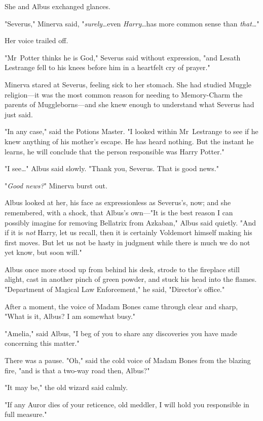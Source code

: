She and Albus exchanged glances.

"Severus," Minerva said, "\emph{surely}…even \emph{Harry}…has
more common sense than \emph{that…}"

Her voice trailed off.

"Mr~Potter thinks he is God," Severus said without expression, "and Lesath
Lestrange fell to his knees before him in a heartfelt cry of prayer."

Minerva stared at Severus, feeling sick to her stomach. She had studied Muggle
religion---it was the most common reason for needing to Memory-Charm the
parents of Muggleborns---and she knew enough to understand what Severus had
just said.

"In any case," said the Potions Master. "I looked within Mr~Lestrange to see
if he knew anything of his mother's escape. He has heard nothing. But the
instant he learns, he will conclude that the person responsible was Harry
Potter."

"I see…" Albus said slowly. "Thank you, Severus. That is good news."

"\emph{Good news?}" Minerva burst out.

Albus looked at her, his face as expressionless as Severus's, now; and she
remembered, with a shock, that Albus's own---"It is the best reason I can
possibly imagine for removing Bellatrix from Azkaban," Albus said quietly. "And
if it is \emph{not} Harry, let us recall, then it is certainly Voldemort
himself making his first moves. But let us not be hasty in judgment while there
is much we do not yet know, but soon will."

Albus once more stood up from behind his desk, strode to the fireplace still
alight, cast in another pinch of green powder, and stuck his head into the
flames. "Department of Magical Law Enforcement," he said, "Director's office."

After a moment, the voice of Madam Bones came through clear and sharp, "What is
it, Albus? I am somewhat busy."

"Amelia," said Albus, "I beg of you to share any discoveries you have made
concerning this matter."

There was a pause. "Oh," said the cold voice of Madam Bones from the blazing
fire, "and is that a two-way road then, Albus?"

"It may be," the old wizard said calmly.

"If any Auror dies of your reticence, old meddler, I will hold you responsible
in full measure."

